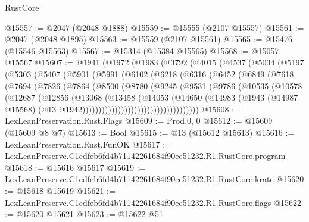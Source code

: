 \begin{lexlean}{RustCore}
\begin{coremodule}
@15557 := @2047 (@2048 @1888)
@15559 := @15555 (@2107 @15557)
@15561 := @2047 (@2048 @1895)
@15563 := @15559 (@2107 @15561)
@15565 := @15476 (@15546 @15563)
@15567 := @15314 (@15384 @15565)
@15568 := @15057 @15567
@15607 := @1941
    (@1972
      (@1983
        (@3792
          (@4015
            (@4537
              (@5034
                (@5197
                  (@5303
                    (@5407
                      (@5901
                        (@5991
                          (@6102
                            (@6218
                              (@6316
                                (@6452
                                  (@6849
                                    (@7618
                                      (@7694
                                        (@7826
                                          (@7864
                                            (@8500
                                              (@8780
                                                (@9245
                                                  (@9531
                                                    (@9786
                                                      (@10535
                                                        (@10578
                                                          (@12687
                                                            (@12856
                                                              (@13068
                                                                (@13458
                                                                  (@14053
                                                                    (@14650
                                                                      (@14983
                                                                        (@1943
                                                                          (@14987 @15568)
                                                                          (@13
                                                                            @1942))))))))))))))))))))))))))))))))))))
@15608 := LexLeanPreservation.Rust.Flags
@15609 := Prod.{0, 0}
@15612 := @15609 (@15609 @8 @7)
@15613 := Bool
@15615 := @13 (@15612 @15613)
@15616 := LexLeanPreservation.Rust.FunOK
@15617 := LexLeanPreserve.C1edfeb6fd4b71142261684f90ee51232.R1.RustCore.program
@15618 := @15616 @15617
@15619 := LexLeanPreserve.C1edfeb6fd4b71142261684f90ee51232.R1.RustCore.krate
@15620 := @15618 @15619
@15621 := LexLeanPreserve.C1edfeb6fd4b71142261684f90ee51232.R1.RustCore.flags
@15622 := @15620 @15621
@15623 := @15622 @51

\end{coremodule}
\end{lexlean}
